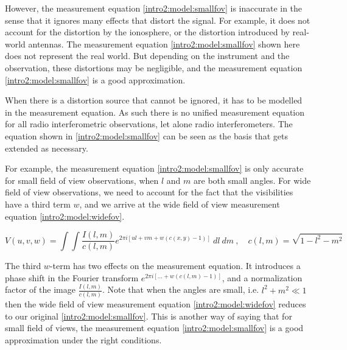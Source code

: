 However, the measurement equation \eqref{intro2:model:smallfov} is inaccurate in the sense that it ignores many effects that distort the signal. For example, it does not account for the distortion by the ionosphere, or the distortion introduced by real-world antennas. The measurement equation \eqref{intro2:model:smallfov} shown here does not represent the real world. But depending on the instrument and the observation, these distortions may be negligible, and the measurement equation \eqref{intro2:model:smallfov} is a good approximation. 

When there is a distortion source that cannot be ignored, it has to be modelled in the measurement equation. As such there is no unified measurement equation for all radio interferometric observations, let alone radio interferometers. The equation shown in \eqref{intro2:model:smallfov} can be seen as the basis that gets extended as necessary\cite{smirnov2011revisiting1, smirnov2011revisiting2, smirnov2011revisiting3, smirnov2011revisiting4}.

For example, the measurement equation \eqref{intro2:model:smallfov} is only accurate for small field of view observations, when $l$ and $m$ are both small angles. For wide field of view observations, we need to account for the fact that the visibilities have a third term $w$, and we arrive at the wide field of view measurement equation \eqref{intro2:model:widefov}.
 
\begin{equation}\label{intro2:model:widefov}
 V(u, v, w) = \int\int  \frac{I(l, m)}{c(l, m)}  e^{2 \pi i [ul+vm+ w(c(x, y) - 1)]} \: dl \: dm \:,  \quad c(l,m) = \sqrt{1 - l^2 - m ^2}
\end{equation}
 
The third $w$-term has two effects on the measurement equation. It introduces a phase shift in the Fourier transform $e^{2 \pi i [\ldots +w(c(l, m) - 1)]}$, and a normalization factor of the image $\frac{I(l, m)}{c(l, m)}$. Note that when the angles are small, i.e. $l^2 +m^2 \ll 1$ then the wide field of view measurement equation \eqref{intro2:model:widefov} reduces to our original \eqref{intro2:model:smallfov}. This is another way of saying that for small field of views, the measurement equation \eqref{intro2:model:smallfov} is a good approximation under the right conditions. 

